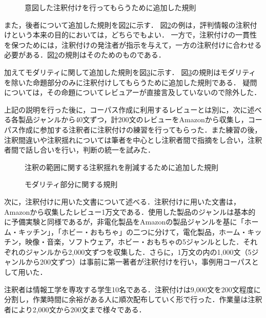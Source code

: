\documentclass[japanese]{jnlp_1.4}
\begin{document}
\begin{figure}[b]

\caption{意図した注釈付けを行ってもらうために追加した規則}
\label{fig:意図した注釈付けを行ってもらうために追加した規則}
\end{figure}

また，後者について追加した規則を図\ref{fig:注釈の範囲に関する注釈揺れを削減するために追加した規則}に示す．
図\ref{fig:注釈の範囲に関する注釈揺れを削減するために追加した規則}の例は，評判情報の注釈付けという本来の目的においては，どちらでもよい．
一方で，注釈付けの一貫性を保つためには，注釈付けの発注者が指示を与えて，一方の注釈付けに合わせる必要がある．図\ref{fig:注釈の範囲に関する注釈揺れを削減するために追加した規則}の規則はそのためのものである．

加えてモダリティに関して追加した規則を図\ref{fig:モダリティ部分に関する規則}に示す．
図\ref{fig:モダリティ部分に関する規則}の規則はモダリティを除いた命題部分のみに注釈付けしてもらうために追加した規則である．
疑問については，その命題についてレビュアーが直接言及していないので除外した．

上記の説明を行った後に，コーパス作成に利用するレビューとは別に，次に述べる各製品ジャンルから40文ずつ，計200文のレビューをAmazonから収集し，コーパス作成に参加する注釈者に注釈付けの練習を行ってもらった．また練習の後，注釈間違いや注釈揺れについては筆者を中心とし注釈者間で指摘をし合い，注釈者間で話し合いを行い，判断の統一を試みた．

\begin{figure}[t]

\caption{注釈の範囲に関する注釈揺れを削減するために追加した規則}
\label{fig:注釈の範囲に関する注釈揺れを削減するために追加した規則}
\end{figure}
\begin{figure}[t]

\caption{モダリティ部分に関する規則}
\label{fig:モダリティ部分に関する規則}
\end{figure}

次に，注釈付けに用いた文書について述べる．注釈付けに用いた文書は，Amazonから収集したレビュー1万文である．使用した製品のジャンルは基本的に予備実験と同様であるが，非電化製品をAmazonの製品ジャンルを基に「ホーム・キッチン」，「ホビー・おもちゃ」の二つに分けて，電化製品，ホーム・キッチン，映像・音楽，ソフトウェア，ホビー・おもちゃの5ジャンルとした．それぞれのジャンルから2,000文ずつを収集した．さらに，1万文の内の1,000文（5ジャンルから200文ずつ）は事前に第一著者が注釈付けを行い，事例用コーパスとして用いた．

注釈者は情報工学を専攻する学生10名である．注釈付けは9,000文を200文程度に分割し，作業時間に余裕がある人に順次配布していく形で行った．作業量は注釈者により2,000文から200文まで様々である．
\end{document}
